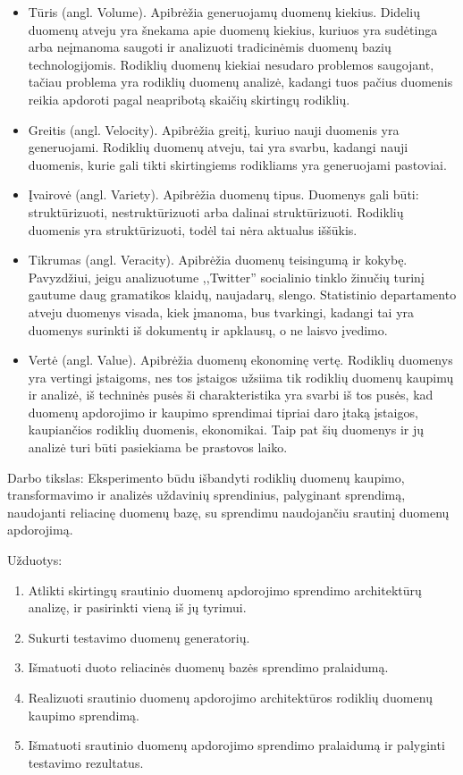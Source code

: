 \documentclass{VUMIFPSkursinis}
\begin{document}
\begin{itemize}
    \item Tūris (angl. Volume). Apibrėžia generuojamų duomenų kiekius. Didelių duomenų atveju yra šnekama apie duomenų kiekius, kuriuos yra sudėtinga arba neįmanoma saugoti 
    ir analizuoti tradicinėmis duomenų bazių technologijomis. Rodiklių duomenų kiekiai nesudaro problemos saugojant, tačiau problema yra rodiklių duomenų analizė, 
    kadangi tuos pačius duomenis reikia apdoroti pagal neapribotą skaičių skirtingų rodiklių.
    \item Greitis (angl. Velocity). Apibrėžia greitį, kuriuo nauji duomenis yra generuojami. Rodiklių duomenų atveju, tai yra svarbu, kadangi nauji duomenis, kurie gali 
    tikti skirtingiems rodikliams yra generuojami pastoviai.
    \item Įvairovė (angl. Variety). Apibrėžia duomenų tipus. Duomenys gali būti: struktūrizuoti, nestruktūrizuoti arba dalinai struktūrizuoti\cite{zikopoulos2011understanding}. 
    Rodiklių duomenis yra struktūrizuoti, todėl tai nėra aktualus iššūkis.
    \item Tikrumas (angl. Veracity). Apibrėžia duomenų teisingumą ir kokybę. Pavyzdžiui, jeigu analizuotume ,,Twitter'' socialinio tinklo žinučių turinį gautume daug gramatikos klaidų, naujadarų, slengo. 
    Statistinio departamento atveju duomenys visada, kiek įmanoma, bus tvarkingi, kadangi tai yra duomenys surinkti iš dokumentų ir apklausų, o ne laisvo įvedimo.
    \item Vertė (angl. Value). Apibrėžia duomenų ekonominę vertę. Rodiklių duomenys yra vertingi įstaigoms, nes tos įstaigos užsiima tik rodiklių duomenų kaupimų ir analizė, iš techninės pusės
    ši charakteristika yra svarbi iš tos pusės, kad duomenų apdorojimo ir kaupimo sprendimai  tipriai daro įtaką įstaigos, kaupiančios rodiklių duomenis, ekonomikai. Taip pat šių duomenys ir jų 
    analizė turi būti pasiekiama be prastovos laiko.
\end{itemize}\par

Darbo tikslas: Eksperimento būdu išbandyti rodiklių duomenų kaupimo, transformavimo ir analizės uždavinių sprendinius, palyginant sprendimą, naudojanti reliacinę duomenų bazę, su sprendimu naudojančiu srautinį duomenų apdorojimą.

Užduotys:
\begin{enumerate}
    \item Atlikti skirtingų srautinio duomenų apdorojimo sprendimo architektūrų analizę, ir pasirinkti vieną iš jų tyrimui.
    \item Sukurti testavimo duomenų generatorių.
    \item Išmatuoti duoto reliacinės duomenų bazės sprendimo pralaidumą.
    \item Realizuoti srautinio duomenų apdorojimo architektūros rodiklių duomenų kaupimo sprendimą.
    \item Išmatuoti srautinio duomenų apdorojimo sprendimo pralaidumą ir palyginti testavimo rezultatus.
\end{enumerate}
\end{document}
